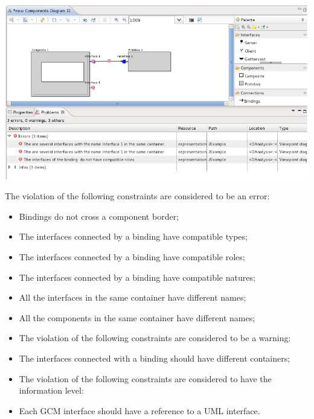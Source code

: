 \documentclass[12pt]{article}
\begin{document}
     \centerline{
     \includegraphics[width=14cm]{draws/valid.png}
     \label{fig:vce-proj}
     }

The violation of the following constraints are considered to be an error:
\begin{itemize}
\item
Bindings do not cross a component border;
\item
The interfaces connected by a binding have compatible types;
\item
The interfaces connected by a binding have compatible roles;
\item
The interfaces connected by a binding have compatible natures;
\item
All the interfaces in the same container have different names;
\item
All the components in the same container have different names;
\item
The violation of the following constraints are considered to be a warning:
\item
The interfaces connected with a binding should have different containers;
\item
The violation of the following constraints are considered to have the information level:
\item
Each GCM interface should have a reference to a UML interface.
\end{itemize}
\end{document}
